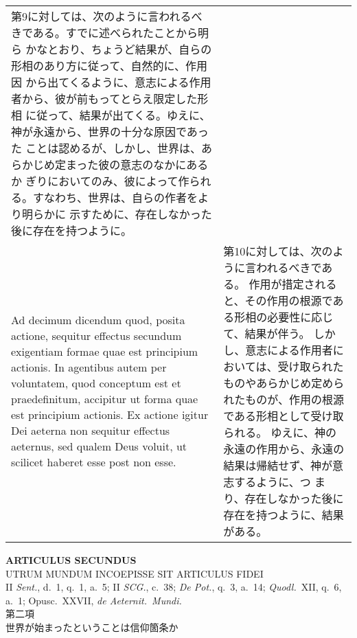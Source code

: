 \documentclass[10pt]{jsarticle} %
\begin{document}
\begin{longtable}{p{21em}p{21em}}
第9に対しては、次のように言われるべきである。すでに述べられたことから明ら
かなとおり、ちょうど結果が、自らの形相のあり方に従って、自然的に、作用因
から出てくるように、意志による作用者から、彼が前もってとらえ限定した形相
に従って、結果が出てくる。ゆえに、神が永遠から、世界の十分な原因であった
ことは認めるが、しかし、世界は、あらかじめ定まった彼の意志のなかにあるか
ぎりにおいてのみ、彼によって作られる。すなわち、世界は、自らの作者をより明らかに
 示すために、存在しなかった後に存在を持つように。


\\


{\sc Ad decimum dicendum} quod, posita actione, sequitur effectus secundum
 exigentiam formae quae est principium actionis. In agentibus autem per
 voluntatem, quod conceptum est et praedefinitum, accipitur ut forma
 quae est principium actionis. Ex actione igitur Dei aeterna non
 sequitur effectus aeternus, sed qualem Deus voluit, ut scilicet haberet
 esse post non esse.

&

第10に対しては、次のように言われるべきである。
作用が措定されると、その作用の根源である形相の必要性に応じて、結果が伴う。
 しかし、意志による作用者においては、受け取られたものやあらかじめ定めら
 れたものが、作用の根源である形相として受け取られる。
ゆえに、神の永遠の作用から、永遠の結果は帰結せず、神が意志するように、つ
 まり、存在しなかった後に存在を持つように、結果がある。


\\


\end{longtable}
\newpage
{}
\begin{center}
 {\Large {\bfseries ARTICULUS SECUNDUS}}\\
{\large UTRUM MUNDUM INCOEPISSE SIT ARTICULUS FIDEI}\\
{\footnotesize II {\itshape Sent.}, d.~1, q.~1, a.~5; II {\itshape
 SCG.}, c.~38; {\itshape De Pot.}, q.~3, a.~14; {\itshape Quodl.}~XII,
 q.~6, a.~1; Opusc.}~XXVII, {\itshape de Aeternit.~Mundi.}\\
{\Large 第二項\\世界が始まったということは信仰箇条か}
\end{center}
\end{document}
